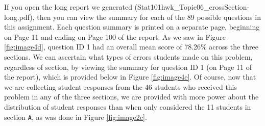 \documentclass{article}\usepackage[]{graphicx}\usepackage[]{color}
\numberwithin{equation}{section} %
\begin{document}
If you open the long report we generated (Stat101hwk\_Topic06\_crossSection-long.pdf), then you can view the summary for each of the 89 possible questions in this assignment. Each question summary is printed on a separate page, beginning on Page 11 and ending on Page 100 of the report. As we saw in Figure \ref{fig:image4d}, question ID 1 had an overall mean score of 78.26\% across the three sections. We can ascertain what types of errors students made on this problem, regardless of section, by viewing the summary for question ID 1 (on Page 11 of the report), which is provided below in Figure \ref{fig:image4e}. Of course, now that we are collecting student responses from the 46 students who received this problem in any of the three sections, we are provided with more power about the distribution of student responses than when only considered the 11 students in section \texttt{A}, as was done in Figure \ref{fig:image2c}.

\begin{center}
\captionsetup{width=\textwidth}
\label{fig:image4e}
\end{center}
\end{document}
